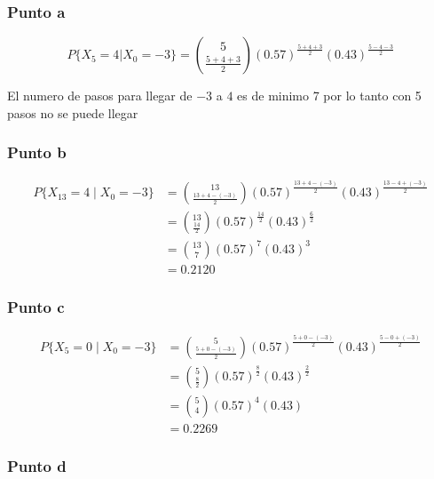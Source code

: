 \documentclass{article}
\begin{document}
\subsubsection*{Punto a}

\[
    P\{X_{5} = 4 | X_0 = -3\} = \binom{5}{\frac{5+4+3}{2}} \left(0.57\right)^{\frac{5+4+3}{2}} \left(0.43\right)^{\frac{5-4-3}{2}}
\]

El numero de pasos para llegar de \(-3\) a \(4\) es de minimo 7 por lo tanto con 5 pasos no se puede llegar

\subsubsection*{Punto b}

\begin{align*}
    P\{X_{13} = 4 \mid X_0 = -3\} & = \binom{13}{\frac{13+4-(-3)}{2}} \left(0.57\right)^{\frac{13 + 4 - (-3)}{2}} \left(0.43\right)^{\frac{13 - 4 + (-3)}{2}} \\
                                  & = \binom{13}{\frac{14}{2}} \left(0.57\right)^{\frac{14}{2}} \left(0.43\right)^{\frac{6}{2}}                               \\
                                  & = \binom{13}{7} \left(0.57\right)^{7} \left(0.43\right)^{3}                                                               \\
                                  & = 0.2120
\end{align*}

\subsubsection*{Punto c}

\begin{align*}
    P\{X_{5} = 0 \mid X_0 = -3\} & = \binom{5}{\frac{5 + 0-(-3)}{2}} \left(0.57\right)^{\frac{5 + 0 - (-3)}{2}} \left(0.43\right)^{\frac{5 - 0 + (-3)}{2}} \\
                                 & = \binom{5}{\frac{8}{2}} \left(0.57\right)^{\frac{8}{2}} \left(0.43\right)^{\frac{2}{2}}                                \\
                                 & = \binom{5}{4} \left(0.57\right)^{4} \left(0.43\right)                                                                  \\
                                 & = 0.2269
\end{align*}

\subsubsection*{Punto d}
\end{document}
